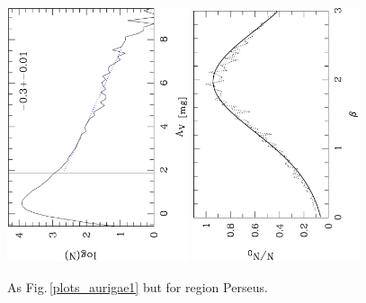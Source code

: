 \documentclass[useAMS,usenatbib]{mn2e}
\begin{document}
\begin{appendix}
\begin{figure}
\includegraphics[height=7.5cm,angle=-90]{av_dist_perseus.ps}
\hfill
\includegraphics[height=7.5cm,angle=-90]{histo_perseus.ps}
\caption{\label{plots_perseus} As Fig.\,\ref{plots_aurigae1} but for region
Perseus.}  

\end{figure}


\end{appendix}
\end{document}
